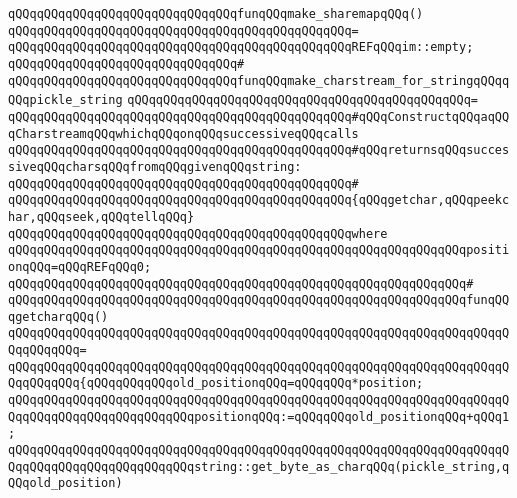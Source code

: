 \verb|qQQqqQQqqQQqqQQqqQQqqQQqqQQqqQQqfunqQQqmake_sharemapqQQq()|\newline
\verb|qQQqqQQqqQQqqQQqqQQqqQQqqQQqqQQqqQQqqQQqqQQqqQQq=|\newline
\verb|qQQqqQQqqQQqqQQqqQQqqQQqqQQqqQQqqQQqqQQqqQQqqQQqREFqQQqim::empty;|\newline
\newline
\verb|qQQqqQQqqQQqqQQqqQQqqQQqqQQqqQQq#|\newline
\verb|qQQqqQQqqQQqqQQqqQQqqQQqqQQqqQQqfunqQQqmake_charstream_for_stringqQQqqQQqpickle_string|\newline
\verb|qQQqqQQqqQQqqQQqqQQqqQQqqQQqqQQqqQQqqQQqqQQqqQQq=|\newline
\verb|qQQqqQQqqQQqqQQqqQQqqQQqqQQqqQQqqQQqqQQqqQQqqQQq#qQQqConstructqQQqaqQQqCharstreamqQQqwhichqQQqonqQQqsuccessiveqQQqcalls|\newline
\verb|qQQqqQQqqQQqqQQqqQQqqQQqqQQqqQQqqQQqqQQqqQQqqQQq#qQQqreturnsqQQqsuccessiveqQQqcharsqQQqfromqQQqgivenqQQqstring:|\newline
\verb|qQQqqQQqqQQqqQQqqQQqqQQqqQQqqQQqqQQqqQQqqQQqqQQq#|\newline
\verb|qQQqqQQqqQQqqQQqqQQqqQQqqQQqqQQqqQQqqQQqqQQqqQQq{qQQqgetchar,qQQqpeekchar,qQQqseek,qQQqtellqQQq}|\newline
\verb|qQQqqQQqqQQqqQQqqQQqqQQqqQQqqQQqqQQqqQQqqQQqqQQqwhere|\newline
\verb|qQQqqQQqqQQqqQQqqQQqqQQqqQQqqQQqqQQqqQQqqQQqqQQqqQQqqQQqqQQqqQQqpositionqQQq=qQQqREFqQQq0;|\newline
\verb|qQQqqQQqqQQqqQQqqQQqqQQqqQQqqQQqqQQqqQQqqQQqqQQqqQQqqQQqqQQqqQQq#|\newline
\verb|qQQqqQQqqQQqqQQqqQQqqQQqqQQqqQQqqQQqqQQqqQQqqQQqqQQqqQQqqQQqqQQqfunqQQqgetcharqQQq()|\newline
\verb|qQQqqQQqqQQqqQQqqQQqqQQqqQQqqQQqqQQqqQQqqQQqqQQqqQQqqQQqqQQqqQQqqQQqqQQqqQQqqQQq=|\newline
\verb|qQQqqQQqqQQqqQQqqQQqqQQqqQQqqQQqqQQqqQQqqQQqqQQqqQQqqQQqqQQqqQQqqQQqqQQqqQQqqQQq{qQQqqQQqqQQqold_positionqQQq=qQQqqQQq*position;|\newline
\newline
\verb|qQQqqQQqqQQqqQQqqQQqqQQqqQQqqQQqqQQqqQQqqQQqqQQqqQQqqQQqqQQqqQQqqQQqqQQqqQQqqQQqqQQqqQQqqQQqqQQqpositionqQQq:=qQQqqQQqold_positionqQQq+qQQq1;|\newline
\newline
\verb|qQQqqQQqqQQqqQQqqQQqqQQqqQQqqQQqqQQqqQQqqQQqqQQqqQQqqQQqqQQqqQQqqQQqqQQqqQQqqQQqqQQqqQQqqQQqqQQqstring::get_byte_as_charqQQq(pickle_string,qQQqold_position)|\newline
